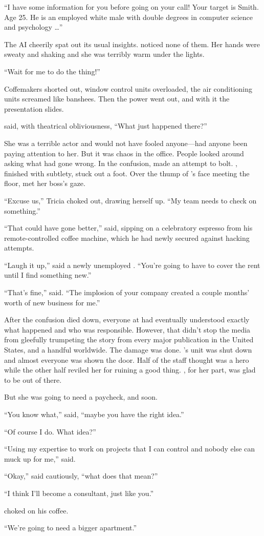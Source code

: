 ``I have some information for you before going on your call! Your target is {\energyJerk} Smith. Age 25. He is an employed white male with double degrees in computer science and psychology \dots''

The AI cheerily spat out its usual insights. {\protag} noticed none of them. Her hands were sweaty and shaking and she was terribly warm under the lights.

``Wait for me to do the thing!''

Coffemakers shorted out, window control units overloaded, the air conditioning units screamed like banshees. Then the power went out, and with it the presentation slides.

{\protag} said, with theatrical obliviousness, ``What just happened there?''

She was a terrible actor and would not have fooled anyone---had anyone been paying attention to her. But it was chaos in the office. People looked around asking what had gone wrong. In the confusion, {\energyJerk} made an attempt to bolt. {\protag}, finished with subtlety, stuck out a foot. Over the thump of {\energyJerk}'s face meeting the floor, {\protag} met her boss's gaze.

``Excuse us,'' Tricia choked out, drawing herself up. ``My team needs to check on something.''

\bigbreak

``That could have gone better,'' {\sidetag} said, sipping on a celebratory espresso from his remote-controlled coffee machine, which he had newly secured against hacking attempts.

``Laugh it up,'' said a newly unemployed {\protag}. ``You're going to have to cover the rent until I find something new.''

``That's fine,'' {\sidetag} said. ``The implosion of your company created a couple months' worth of new business for me.''

After the confusion died down, everyone at {\energyCompany} had eventually understood exactly what happened and who was responsible. However, that didn't stop the media from gleefully trumpeting the story from every major publication in the United States, and a handful worldwide. The damage was done. {\protag}'s unit was shut down and almost everyone was shown the door. Half of the staff thought {\protag} was a hero while the other half reviled her for ruining a good thing. {\protag}, for her part, was glad to be out of there.

But she was going to need a paycheck, and soon.

``You know what,'' {\protag} said, ``maybe you have the right idea.''

``Of course I do. What idea?''

``Using my expertise to work on projects that I can control and nobody else can muck up for me,'' {\protag} said.

``Okay,'' {\sidetag} said cautiously, ``what does that mean?''

``I think I'll become a consultant, just like you.''

{\sidetag} choked on his coffee.

``We're going to need a bigger apartment.''

